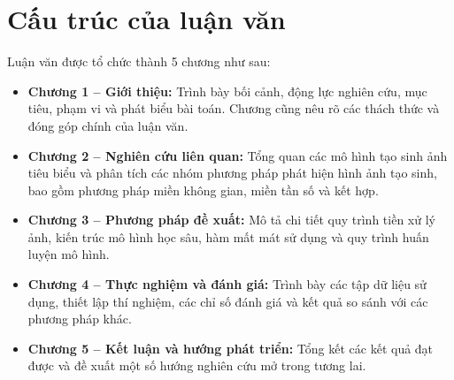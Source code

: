 \section{Cấu trúc của luận văn}

Luận văn được tổ chức thành 5 chương như sau:

\begin{itemize}
	\item \textbf{Chương 1 – Giới thiệu:} Trình bày bối cảnh, động lực nghiên cứu, mục tiêu, phạm vi và phát biểu bài toán. Chương cũng nêu rõ các thách thức và đóng góp chính của luận văn.
	
	\item \textbf{Chương 2 – Nghiên cứu liên quan:} Tổng quan các mô hình tạo sinh ảnh tiêu biểu và phân tích các nhóm phương pháp phát hiện hình ảnh tạo sinh, bao gồm phương pháp miền không gian, miền tần số và kết hợp.
	
	\item \textbf{Chương 3 – Phương pháp đề xuất:} Mô tả chi tiết quy trình tiền xử lý ảnh, kiến trúc mô hình học sâu, hàm mất mát sử dụng và quy trình huấn luyện mô hình.
	
	\item \textbf{Chương 4 – Thực nghiệm và đánh giá:} Trình bày các tập dữ liệu sử dụng, thiết lập thí nghiệm, các chỉ số đánh giá và kết quả so sánh với các phương pháp khác.
	
	\item \textbf{Chương 5 – Kết luận và hướng phát triển:} Tổng kết các kết quả đạt được và đề xuất một số hướng nghiên cứu mở trong tương lai.
\end{itemize}









